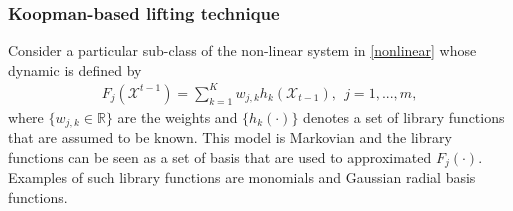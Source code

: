\subsubsection{Koopman-based lifting technique}
Consider a particular sub-class of the non-linear system in \eqref{nonlinear} whose dynamic is defined by
\begin{align}\label{nonlin}
F_{j}(\mathcal{X}^{t-1}) = \sum_{k=1}^K w_{j,k} h_k(\mathcal{X}_{t-1}), \ \ j=1,...,m,
\end{align}
where $\{w_{j,k}\in\mathbb{R}\}$ are the weights and $\{h_k(\cdot)\}$ denotes a set of library functions that are assumed to be known.
This model is Markovian and the library functions can be seen as a set of basis that are used to approximated $F_j(\cdot)$.
Examples of such library functions are monomials and Gaussian radial basis functions. 



